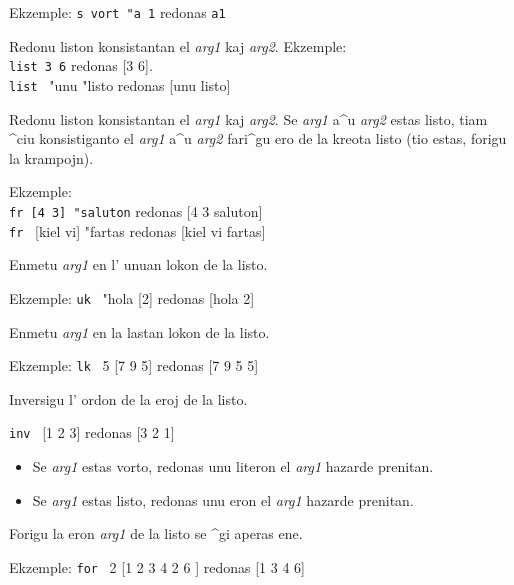 Ekzemple: \texttt{s vort "a 1} redonas \texttt{a1}


Redonu liston konsistantan el \textit{arg1} kaj \textit{arg2}. Ekzemple:\\
\texttt{list 3 6} redonas {[}3 6{]}. \\
\texttt{list} \ {}"unu {}"listo redonas {[}unu listo{]}


Redonu liston konsistantan el \textit{arg1} kaj \textit{arg2}.
Se \textit{arg1} a^u \textit{arg2} estas listo, tiam ^ciu konsistiganto el
\textit{arg1} a^u \textit{arg2} fari^gu ero de la kreota listo
(tio estas, forigu la krampojn).

Ekzemple: \\
\texttt{fr [4 3] {}"saluton} redonas [4 3 saluton]\\
\texttt{fr} \ {}{[}kiel vi{]} {}"fartas redonas {[}kiel vi fartas{]}


Enmetu \textit{arg1} en l' unuan lokon de la listo.

Ekzemple: \texttt{uk} \ {}{}"hola {[}2{]} redonas {[}hola 2{]}


Enmetu \textit{arg1} en la lastan lokon de la listo.

Ekzemple: \texttt{lk} \ 5 {[}7 9 5{]} redonas {[}7 9 5 5{]}

Inversigu l' ordon de la eroj de la listo.

 \texttt{inv} \ {}{[}1 2 3{]} redonas {[}3 2 1{]}

\begin{itemize}
\item Se \textit{arg1} estas vorto, redonas unu literon el
  \textit{arg1} hazarde prenitan.
\item Se \textit{arg1} estas listo, redonas unu eron el \textit{arg1}
  hazarde prenitan.
\end{itemize}
\noindent


Forigu la eron \textit{arg1} de la listo se ^gi aperas ene.

Ekzemple: \texttt{for} \ 2 {[}1 2 3 4 2 6 {]} redonas {[}1 3 4 6{]}


